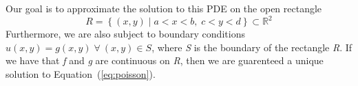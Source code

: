 \documentclass[12pt, titlepage]{article}
\begin{document}
    Our goal is to approximate the solution to this PDE on the open rectangle 
    \begin{equation*}
        R = \left\{(x,y)\; |\; a < x < b,\; c < y < d\right\} \subset \mathbb{R}^2
    \end{equation*}
    Furthermore, we are also subject to boundary conditions $u(x,y) = g(x,y)\;\forall\:(x,y)\in S$, where \textit{S} is
    the boundary of the rectangle \textit{R}. If we have that \textit{f} and \textit{g} are continuous on \textit{R}, then 
    we are guarenteed a unique solution to Equation~(\ref{eq:poisson}).
    \newpage 
    
    {}
\end{document}
